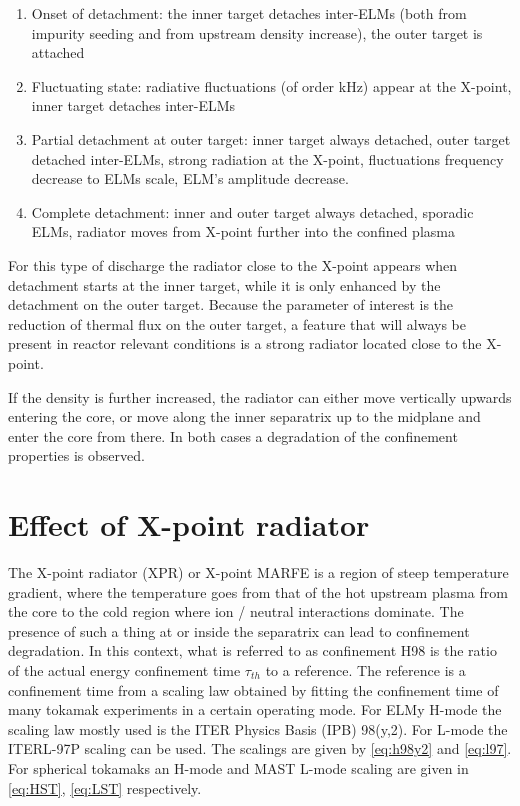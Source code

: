 \begin{enumerate}
    \item Onset of detachment: the inner target detaches inter-ELMs (both from impurity seeding and from upstream density increase), the outer target is attached
    \item Fluctuating state: radiative fluctuations (of order kHz) appear at the X-point, inner target detaches inter-ELMs
    \item Partial detachment at outer target: inner target always detached, outer target detached inter-ELMs, strong radiation at the X-point, fluctuations frequency decrease to ELMs scale, ELM's amplitude decrease.
    \item Complete detachment: inner and outer target always detached, sporadic ELMs, radiator moves from X-point further into the confined plasma
\end{enumerate}

For this type of discharge the radiator close to the X-point appears when detachment starts at the inner target, while it is only enhanced by the detachment on the outer target. Because the parameter of interest is the reduction of thermal flux on the outer target, a feature that will always be present in reactor relevant conditions is a strong radiator located close to the X-point.

If the density is further increased, the radiator can either move vertically upwards entering the core\cite{Bernert2021}, or move along the inner separatrix up to the midplane and enter the core from there.\cite{Lipschultz1984} In both cases a degradation of the confinement properties is observed.

\section{Effect of X-point radiator}\label{Effect of X-point radiator}


The X-point radiator (XPR)\cite{Bernert2021} or X-point MARFE\cite{Kallenbach2015a} is a region of steep temperature gradient, where the temperature goes from that of the hot upstream plasma from the core to the cold region where ion / neutral interactions dominate. The presence of such a thing at or inside the separatrix can lead to confinement degradation. In this context, what is referred to as confinement H98 is the ratio of the actual energy confinement time $\tau_{th}$ to a reference. The reference is a confinement time from a scaling law obtained by fitting the confinement time of many tokamak experiments in a certain operating mode. For ELMy H-mode the scaling law mostly used is the ITER Physics Basis (IPB) 98(y,2).\cite{Doyle2007} For L-mode the ITERL-97P scaling can be used. \cite{Kaye1997} The scalings are given by \autoref{eq:h98y2} and \ref{eq:l97}. For spherical tokamaks an H-mode \cite{Kaye2006} and MAST L-mode \cite{Kaye2021} scaling are given in \autoref{eq:HST}, \ref{eq:LST} respectively.


